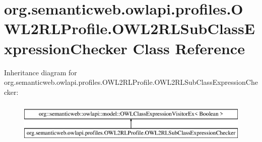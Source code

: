 \hypertarget{classorg_1_1semanticweb_1_1owlapi_1_1profiles_1_1_o_w_l2_r_l_profile_1_1_o_w_l2_r_l_sub_class_expression_checker}{\section{org.\-semanticweb.\-owlapi.\-profiles.\-O\-W\-L2\-R\-L\-Profile.\-O\-W\-L2\-R\-L\-Sub\-Class\-Expression\-Checker Class Reference}
\label{classorg_1_1semanticweb_1_1owlapi_1_1profiles_1_1_o_w_l2_r_l_profile_1_1_o_w_l2_r_l_sub_class_expression_checker}
}
Inheritance diagram for org.\-semanticweb.\-owlapi.\-profiles.\-O\-W\-L2\-R\-L\-Profile.\-O\-W\-L2\-R\-L\-Sub\-Class\-Expression\-Checker\-:\begin{figure}[H]
\begin{center}
\leavevmode
\includegraphics[height=2.000000cm]{classorg_1_1semanticweb_1_1owlapi_1_1profiles_1_1_o_w_l2_r_l_profile_1_1_o_w_l2_r_l_sub_class_expression_checker}
\end{center}
\end{figure}
